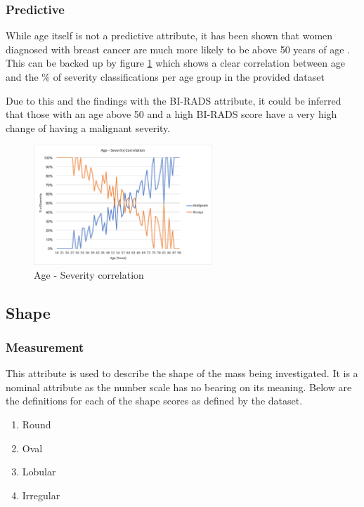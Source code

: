 \documentclass[12pt]{article}
\begin{document}
      \subsubsection{Predictive}
        While age itself is not a predictive attribute, it has been shown that women diagnosed with breast cancer are much more likely to be above 50 years of age \citep{kerlikowske1993mammography}. This can be backed up by figure \ref{fig:age-severity-correlation} which shows a clear correlation between age and the \% of severity classifications per age group in the provided dataset

        Due to this and the findings with the BI-RADS attribute, it could be inferred that those with an age above 50 and a high BI-RADS score have a very high change of having a malignant severity.

        \begin{figure}[H]
          \centering
          \includegraphics[width=0.6\textwidth]{age-severity-correlation}
          \caption{Age - Severity correlation}
          \label{fig:age-severity-correlation}
        \end{figure}


    \subsection{Shape}
      \subsubsection{Measurement}
        This attribute is used to describe the shape of the mass being investigated. It is a nominal attribute as the number scale has no bearing on its meaning. Below are the definitions for each of the shape scores as defined by the dataset.

        \begin{enumerate}[label=\arabic*)]
          \item Round
          \item Oval
          \item Lobular
          \item Irregular
        \end{enumerate}
\end{document}
